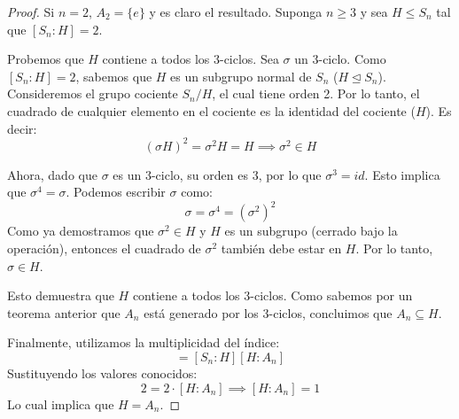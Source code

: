 \begin{proof}
    Si $n=2$, $A_2=\{e\}$ y es claro el resultado.
    Suponga $n \geq 3$ y sea $H \leq S_n$ tal que $[S_n : H] = 2$.
    
    Probemos que $H$ contiene a todos los 3-ciclos.
    Sea $\sigma$ un 3-ciclo. Como $[S_n : H] = 2$, sabemos que $H$ es un subgrupo normal de $S_n$ ($H \trianglelefteq S_n$).
    Consideremos el grupo cociente $S_n/H$, el cual tiene orden 2. Por lo tanto, el cuadrado de cualquier elemento en el cociente es la identidad del cociente ($H$). Es decir:
    \begin{equation*}
        (\sigma H)^2 = \sigma^2 H = H \implies \sigma^2 \in H
    \end{equation*}
    
    Ahora, dado que $\sigma$ es un 3-ciclo, su orden es 3, por lo que $\sigma^3 = id$. Esto implica que $\sigma^4 = \sigma$.
    Podemos escribir $\sigma$ como:
    \begin{equation*}
        \sigma = \sigma^4 = (\sigma^2)^2
    \end{equation*}
    Como ya demostramos que $\sigma^2 \in H$ y $H$ es un subgrupo (cerrado bajo la operación), entonces el cuadrado de $\sigma^2$ también debe estar en $H$.
    Por lo tanto, $\sigma \in H$.
    
    Esto demuestra que $H$ contiene a todos los 3-ciclos. Como sabemos por un teorema anterior que $A_n$ está generado por los 3-ciclos, concluimos que $A_n \subseteq H$.
    
    Finalmente, utilizamos la multiplicidad del índice:
    \begin{equation*}
        [S_n : A_n] = [S_n : H][H : A_n]
    \end{equation*}
    Sustituyendo los valores conocidos:
    \begin{equation*}
        2 = 2 \cdot [H : A_n] \implies [H : A_n] = 1
    \end{equation*}
    Lo cual implica que $H = A_n$.
\end{proof}


